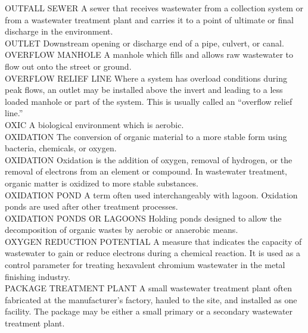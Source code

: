 \documentclass{article}
\begin{document}
OUTFALL SEWER
A sewer that receives wastewater from a collection system or from a wastewater treatment plant and carries it to a point of ultimate or final discharge in the environment. 
\vspace{0.3cm}\\
OUTLET
Downstream opening or discharge end of a pipe, culvert, or canal. 
\vspace{0.3cm}\\
OVERFLOW MANHOLE
A manhole which fills and allows raw wastewater to flow out onto the street or ground. 
\vspace{0.3cm}\\
OVERFLOW RELIEF LINE
Where a system has overload conditions during peak flows, an outlet may be installed above the invert and leading to a less loaded manhole or part of the system. This is usually called an “overflow relief line.” 
\vspace{0.3cm}\\
OXIC
A biological environment which is aerobic.
\vspace{0.3cm}\\
OXIDATION
The conversion of organic material to a more stable form using bacteria, chemicals, or oxygen.
\vspace{0.3cm}\\
OXIDATION
Oxidation is the addition of oxygen, removal of hydrogen, or the removal of electrons from an element or compound. In wastewater treatment, organic matter is oxidized to more stable substances.
\vspace{0.3cm}\\
OXIDATION POND
A term often used interchangeably with lagoon. Oxidation ponds are used after other treatment processes.
\vspace{0.3cm}\\
OXIDATION PONDS OR LAGOONS
Holding ponds designed to allow the decomposition of organic wastes by aerobic or anaerobic means.
\vspace{0.3cm}\\
OXYGEN REDUCTION POTENTIAL
A measure that indicates the capacity of wastewater to gain or reduce electrons during a chemical reaction. It is used as a control parameter for treating hexavalent chromium wastewater in the metal finishing industry.
\vspace{0.3cm}\\
PACKAGE TREATMENT PLANT
A small wastewater treatment plant often fabricated at the manufacturer’s factory, hauled to the site, and installed as one facility. The package may be either a small primary or a secondary wastewater treatment plant.
\end{document}
